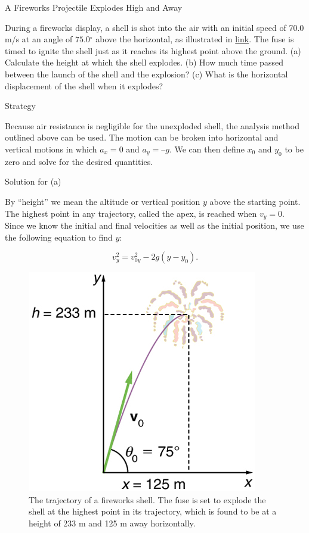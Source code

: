 \documentclass[
]{book}
\begin{document}
\hypertarget{fs-id2175010}{}
A Fireworks Projectile Explodes High and Away

During a fireworks display, a shell is shot into the air with an initial
speed of 70.0 m/s at an angle of \(75.0{^\circ}\) above the horizontal, as
illustrated in \protect\hyperlink{import-auto-id934168}{link}.
The fuse is timed to ignite the shell just as it reaches its highest
point above the ground. (a) Calculate the height at which the shell
explodes. (b) How much time passed between the launch of the shell and
the explosion? (c) What is the horizontal displacement of the shell when
it explodes?

{Strategy}

Because air resistance is negligible for the unexploded shell, the
analysis method outlined above can be used. The motion can be broken
into horizontal and vertical motions in which \({a_{x} = 0}{}\) and
\({a_{y} = –g}{}\). We can then define \(x_{0}{}\) and \(y_{0}{}\) to be zero
and solve for the desired quantities.

{Solution for (a)}

By ``height'' we mean the altitude or vertical position \(y{}\) above the
starting point. The highest point in any trajectory, called the apex, is
reached when \({v_{y} = 0}{}\). Since we know the initial and final
velocities as well as the initial position, we use the following
equation to find \(y{}\):

\leavevmode{}%
\[{{v_{y}^{2} = {v_{0y}^{2} - 2g}}({y - y_{0}})\text{.}}{}\]

\begin{figure}
\hypertarget{import-auto-id934168}{%
\centering
\includegraphics{images/Figure_03_04_03a.jpg}
\caption{The trajectory of a fireworks shell. The fuse is set to explode the
shell at the highest point in its trajectory, which is found to be at a
height of 233 m and 125 m away
horizontally.}\label{import-auto-id934168}
}
\end{figure}
\end{document}
